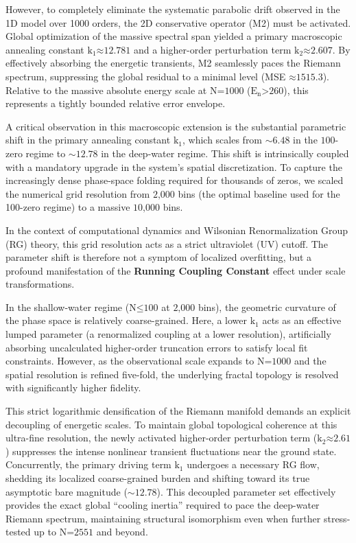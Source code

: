 However, to completely eliminate the systematic parabolic drift observed
in the 1D model over 1000 orders, the 2D conservative operator (M2) must
be activated. Global optimization of the massive spectral span yielded a
primary macroscopic annealing constant
\(\text{k}_{\text{1}}\text{≈12.781}\) and a higher-order perturbation
term \(\text{k}_{\text{2}}\text{≈2.607}\). By effectively absorbing the
energetic transients, M2 seamlessly paces the Riemann spectrum,
suppressing the global residual to a minimal level (MSE
\(\text{≈1515.3}\)). Relative to the massive absolute energy scale at
\(\text{N}\text{=1000}\) (\(\text{E}_{\text{n}}\text{>260}\)), this
represents a tightly bounded relative error envelope.

A critical observation in this macroscopic extension is the substantial
parametric shift in the primary annealing constant
\(\text{k}_{\text{1}}\), which scales from \(\text{∼6.48}\) in the
\(\text{100}\)-zero regime to \(\text{∼12.78}\) in the deep-water
regime. This shift is intrinsically coupled with a mandatory upgrade in
the system's spatial discretization. To capture the increasingly dense
phase-space folding required for thousands of zeros, we scaled the
numerical grid resolution from \(\text{2,000}\) bins (the optimal
baseline used for the 100-zero regime) to a massive \(\text{10,000}\)
bins.

In the context of computational dynamics and Wilsonian Renormalization
Group (RG) theory, this grid resolution acts as a strict ultraviolet
(UV) cutoff. The parameter shift is therefore not a symptom of localized
overfitting, but a profound manifestation of the \textbf{Running
Coupling Constant} effect under scale transformations.

In the shallow-water regime (\(\text{N}\text{≤100}\) at \(\text{2,000}\)
bins), the geometric curvature of the phase space is relatively
coarse-grained. Here, a lower \(\text{k}_{\text{1}}\) acts as an
effective lumped parameter (a renormalized coupling at a lower
resolution), artificially absorbing uncalculated higher-order truncation
errors to satisfy local fit constraints. However, as the observational
scale expands to \(\text{N}\text{=1000}\) and the spatial resolution is
refined five-fold, the underlying fractal topology is resolved with
significantly higher fidelity.

This strict logarithmic densification of the Riemann manifold demands an
explicit decoupling of energetic scales. To maintain global topological
coherence at this ultra-fine resolution, the newly activated
higher-order perturbation term (\(\text{k}_{\text{2}}\text{≈2.61}\))
suppresses the intense nonlinear transient fluctuations near the ground
state. Concurrently, the primary driving term \(\text{k}_{\text{1}}\)
undergoes a necessary RG flow, shedding its localized coarse-grained
burden and shifting toward its true asymptotic bare magnitude
(\(\text{∼12.78}\)). This decoupled parameter set effectively provides
the exact global ``cooling inertia'' required to pace the deep-water
Riemann spectrum, maintaining structural isomorphism even when further
stress-tested up to \(\text{N}\text{=2551}\) and beyond.


